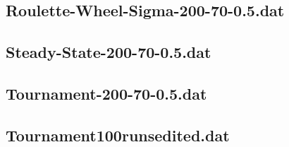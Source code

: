 \documentclass[titlepage, a4paper, 12pt]{article}
\begin{document}
\subsection{Roulette-Wheel-Sigma-200-70-0.5.dat}\label{Roulette-Wheel-Sigma-200-70-0.5.dat}
\begin{footnotesize}
  
\end{footnotesize}

\subsection{Steady-State-200-70-0.5.dat}\label{Steady-State-200-70-0.5.dat}
\begin{footnotesize}
  
\end{footnotesize}

\subsection{Tournament-200-70-0.5.dat}\label{Tournament-200-70-0.5.dat}
\begin{footnotesize}
  
\end{footnotesize}

\subsection{Tournament100runsedited.dat}\label{Tournament100runsedited.dat}
\begin{footnotesize}
  
\end{footnotesize}
\end{document}
